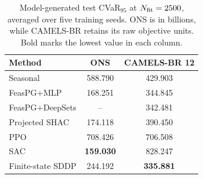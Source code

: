 \begin{table}[!htbp]
\caption{Model-generated test CVaR$_{95}$ at
\(N_{\rm fit}=2500\), averaged over five training seeds. ONS is in billions, while
CAMELS-BR retains its raw objective units. Bold marks the lowest value in each column.}
\label{tab:real-mean-cvar}
\centering
\scriptsize
\setlength{\tabcolsep}{2.5pt}
\begin{tabular}{@{}lcc@{}}
\toprule
Method & ONS & CAMELS-BR 12\\
\midrule
Seasonal & 588.790 & 429.903\\
FeasPG+MLP & 168.251 & 344.845\\
FeasPG+DeepSets & -- & 342.481\\
Projected SHAC & 174.118 & 390.450\\
PPO & 708.426 & 706.508\\
SAC & \textbf{159.030} & 828.247\\
Finite-state SDDP & 244.192 & \textbf{335.881}\\
\bottomrule
\end{tabular}
\end{table}
